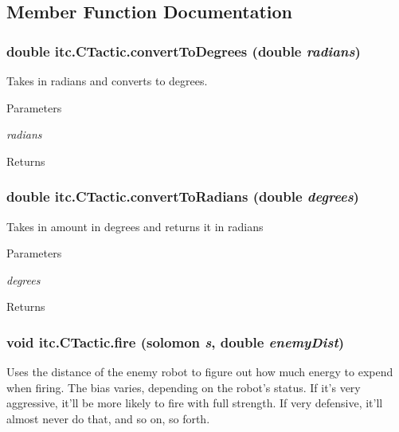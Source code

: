 \subsection{Member Function Documentation}
\hypertarget{classitc_1_1_c_tactic_a89700cf4d890854f0c310a82e8f4fb8d}{
\subsubsection[{convertToDegrees}]{\setlength{\rightskip}{0pt plus 5cm}double itc.CTactic.convertToDegrees (double {\em radians})}}
\label{classitc_1_1_c_tactic_a89700cf4d890854f0c310a82e8f4fb8d}
Takes in radians and converts to degrees. 
\begin{DoxyParams}{Parameters}
\item[{\em radians}]\end{DoxyParams}
\begin{DoxyReturn}{Returns}

\end{DoxyReturn}
\hypertarget{classitc_1_1_c_tactic_a0fb7344f1a8072b2f764f7b76444b89e}{
\subsubsection[{convertToRadians}]{\setlength{\rightskip}{0pt plus 5cm}double itc.CTactic.convertToRadians (double {\em degrees})}}
\label{classitc_1_1_c_tactic_a0fb7344f1a8072b2f764f7b76444b89e}
Takes in amount in degrees and returns it in radians 
\begin{DoxyParams}{Parameters}
\item[{\em degrees}]\end{DoxyParams}
\begin{DoxyReturn}{Returns}

\end{DoxyReturn}
\hypertarget{classitc_1_1_c_tactic_a3d4f7c60b5eb048608b96e4c8c8fad24}{
\subsubsection[{fire}]{\setlength{\rightskip}{0pt plus 5cm}void itc.CTactic.fire ({\bf solomon} {\em s}, \/  double {\em enemyDist})}}
\label{classitc_1_1_c_tactic_a3d4f7c60b5eb048608b96e4c8c8fad24}
Uses the distance of the enemy robot to figure out how much energy to expend when firing. The bias varies, depending on the robot's status. If it's very aggressive, it'll be more likely to fire with full strength. If very defensive, it'll almost never do that, and so on, so forth.


